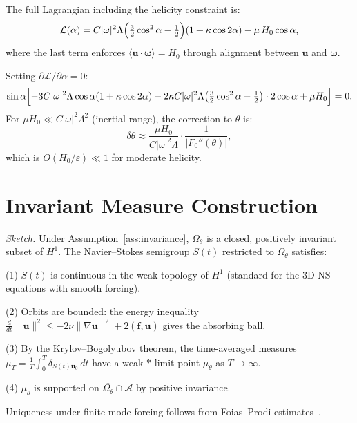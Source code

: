 \documentclass[12pt,a4paper]{article}
\begin{document}
The full Lagrangian including the helicity constraint is:
\begin{equation}
\mathcal{L}(\alpha) = C|\omega|^2\Lambda\Bigl(\tfrac{3}{2}\cos^2\alpha - \tfrac{1}{2}\Bigr)(1 + \kappa\cos 2\alpha) - \mu\,H_0\cos\alpha,
\end{equation}
where the last term enforces $\langle\bm{u}\cdot\bm{\omega}\rangle = H_0$ through alignment between $\bm{u}$ and $\bm{\omega}$.

Setting $\partial\mathcal{L}/\partial\alpha = 0$:
\begin{equation}
\sin\alpha\Bigl[-3C|\omega|^2\Lambda\cos\alpha(1 + \kappa\cos 2\alpha) - 2\kappa C|\omega|^2\Lambda\bigl(\tfrac{3}{2}\cos^2\alpha - \tfrac{1}{2}\bigr)\cdot 2\cos\alpha + \mu H_0\Bigr] = 0.
\end{equation}
For $\mu H_0 \ll C|\omega|^2\Lambda^2$ (inertial range), the correction to $\theta$ is:
\begin{equation}
\delta\theta \approx \frac{\mu H_0}{C|\omega|^2\Lambda}\cdot\frac{1}{|F_0''(\theta)|},
\end{equation}
which is $O(H_0/\varepsilon) \ll 1$ for moderate helicity.

\section{Invariant Measure Construction}
\label{app:measure}

\noindent\emph{Sketch.}
Under Assumption~\ref{ass:invariance}, $\Omega_\theta$ is a closed, positively invariant subset of $H^1$.
The Navier--Stokes semigroup $S(t)$ restricted to $\Omega_\theta$ satisfies:

(1) $S(t)$ is continuous in the weak topology of $H^1$ (standard for the 3D NS equations with smooth forcing).

(2) Orbits are bounded: the energy inequality $\tfrac{d}{dt}\|\bm{u}\|^2 \leq -2\nu\|\nabla\bm{u}\|^2 + 2(\bm{f},\bm{u})$ gives the absorbing ball.

(3) By the Krylov--Bogolyubov theorem, the time-averaged measures $\mu_T = \tfrac{1}{T}\int_0^T \delta_{S(t)\bm{u}_0}\,dt$ have a weak-$*$ limit point $\mu_\theta$ as $T\to\infty$.

(4) $\mu_\theta$ is supported on $\overline{\Omega_\theta} \cap \mathcal{A}$ by positive invariance.

Uniqueness under finite-mode forcing follows from Foias--Prodi estimates~\cite{FoiasProdi1967}.
\end{document}
